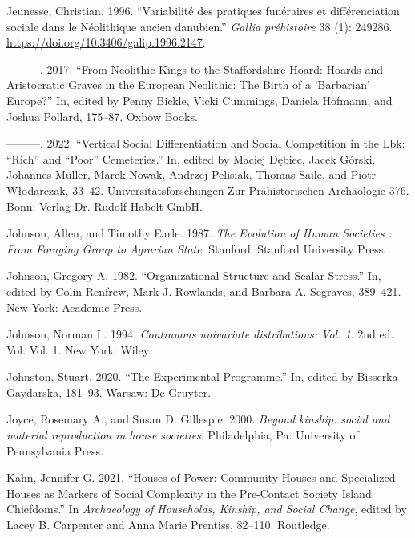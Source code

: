 \documentclass[
  12pt,
  a4paper, twoside]{book}
\newlength{\cslhangindent}
\newlength{\cslentryspacingunit} %
\newenvironment{CSLReferences}[2] %
 {%
  \setlength{\parindent}{0pt}
  \ifodd #1
  \let\oldpar\par
  \def\par{\hangindent=\cslhangindent\oldpar}
  \fi
  \setlength{\parskip}{#2\cslentryspacingunit}
 }%
 {}
\begin{document}
\begin{CSLReferences}{1}{0}
\leavevmode{}%
Jeunesse, Christian. 1996. {``Variabilité des pratiques funéraires et différenciation sociale dans le Néolithique ancien danubien.''} \emph{Gallia préhistoire} 38 (1): 249286. \url{https://doi.org/10.3406/galip.1996.2147}.

\leavevmode{}%
---------. 2017. {``From Neolithic Kings to the Staffordshire Hoard: Hoards and Aristocratic Graves in the European Neolithic: The Birth of a 'Barbarian' Europe?''} In, edited by Penny Bickle, Vicki Cummings, Daniela Hofmann, and Joshua Pollard, 175--87. Oxbow Books.

\leavevmode{}%
---------. 2022. {``Vertical Social Differentiation and Social Competition in the Lbk: {``}Rich{''} and {``}Poor{''} Cemeteries.''} In, edited by Maciej Dębiec, Jacek Górski, Johannes Müller, Marek Nowak, Andrzej Pelisiak, Thomas Saile, and Piotr Włodarczak, 33--42. Universitätsforschungen Zur Prähistorischen Archäologie 376. Bonn: Verlag Dr. Rudolf Habelt GmbH.

\leavevmode{}%
Johnson, Allen, and Timothy Earle. 1987. \emph{The Evolution of Human Societies : From Foraging Group to Agrarian State}. Stanford: Stanford University Press.

\leavevmode{}%
Johnson, Gregory A. 1982. {``Organizational Structure and Scalar Stress.''} In, edited by Colin Renfrew, Mark J. Rowlands, and Barbara A. Segraves, 389--421. New York: Academic Press.

\leavevmode{}%
Johnson, Norman L. 1994. \emph{Continuous univariate distributions: Vol. 1}. 2nd ed. Vol. Vol. 1. New York: Wiley.

\leavevmode{}%
Johnston, Stuart. 2020. {``The Experimental Programme.''} In, edited by Bisserka Gaydarska, 181--93. Warsaw: De Gruyter.

\leavevmode{}%
Joyce, Rosemary A., and Susan D. Gillespie. 2000. \emph{Beyond kinship: social and material reproduction in house societies}. Philadelphia, Pa: University of Pennsylvania Press.

\leavevmode{}%
Kahn, Jennifer G. 2021. {``Houses of Power: {Community} Houses and Specialized Houses as Markers of Social Complexity in the Pre-Contact {Society Island} Chiefdoms.''} In \emph{Archaeology of {Households}, {Kinship}, and {Social Change}}, edited by Lacey B. Carpenter and Anna Marie Prentiss, 82--110. {Routledge}.


\end{CSLReferences}
\end{document}

